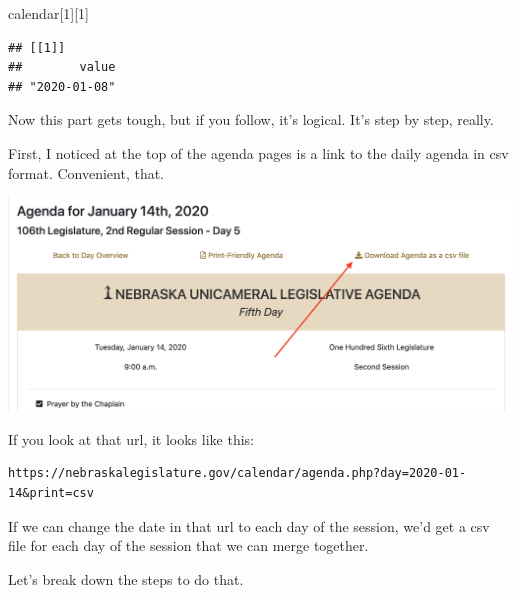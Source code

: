 \documentclass[]{book}
\newenvironment{Shaded}{\begin{snugshade}}{\end{snugshade}}
\newcommand{\DecValTok}[1]{\textcolor[rgb]{0.00,0.00,0.81}{#1}}
\newcommand{\NormalTok}[1]{#1}
\begin{document}
\begin{Shaded}
\begin{Highlighting}[]
\NormalTok{calendar[}\DecValTok{1}\NormalTok{][}\DecValTok{1}\NormalTok{]}
\end{Highlighting}
\end{Shaded}

\begin{verbatim}
## [[1]]
##        value 
## "2020-01-08"
\end{verbatim}

Now this part gets tough, but if you follow, it's logical. It's step by step, really.

First, I noticed at the top of the agenda pages is a link to the daily agenda in csv format. Convenient, that.

\includegraphics[width=26.39in]{images/advrvest2}

If you look at that url, it looks like this:

\begin{verbatim}
https://nebraskalegislature.gov/calendar/agenda.php?day=2020-01-14&print=csv
\end{verbatim}

If we can change the date in that url to each day of the session, we'd get a csv file for each day of the session that we can merge together.

Let's break down the steps to do that.
\end{document}
